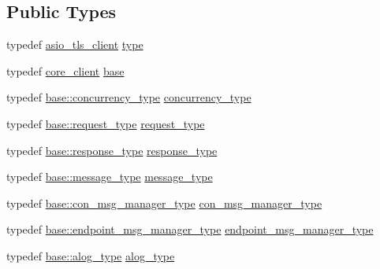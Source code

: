\subsection*{Public Types}
\begin{DoxyCompactItemize}
\item 
typedef \hyperlink{structwebsocketpp_1_1config_1_1asio__tls__client}{asio\+\_\+tls\+\_\+client} \hyperlink{structwebsocketpp_1_1config_1_1asio__tls__client_ac326e9357688f306119aacc22639259e}{type}
\item 
typedef \hyperlink{structwebsocketpp_1_1config_1_1core__client}{core\+\_\+client} \hyperlink{structwebsocketpp_1_1config_1_1asio__tls__client_ac352cb7bbd677155ad5329e7b419013f}{base}
\item 
typedef \hyperlink{structwebsocketpp_1_1config_1_1core__client_a4efeeb870e648c7405daab92d10fa5d6}{base\+::concurrency\+\_\+type} \hyperlink{structwebsocketpp_1_1config_1_1asio__tls__client_afd8b2322960ee1c93994d6a7a344fb4b}{concurrency\+\_\+type}
\item 
typedef \hyperlink{structwebsocketpp_1_1config_1_1core__client_a1fd74b16e3add246b1c356f6f14f206b}{base\+::request\+\_\+type} \hyperlink{structwebsocketpp_1_1config_1_1asio__tls__client_a43e2f23d37d5e3e5c6bc8d0b54f6c578}{request\+\_\+type}
\item 
typedef \hyperlink{structwebsocketpp_1_1config_1_1core__client_a5d8d6a90c7f36442a61a615da2ac8dcc}{base\+::response\+\_\+type} \hyperlink{structwebsocketpp_1_1config_1_1asio__tls__client_a8023cbcdddfd409027a88bbb1c5b6175}{response\+\_\+type}
\item 
typedef \hyperlink{structwebsocketpp_1_1config_1_1core__client_ae370adc4110d5d6c709167462467b11c}{base\+::message\+\_\+type} \hyperlink{structwebsocketpp_1_1config_1_1asio__tls__client_a3e879905aed676bdda6dce35f5d6956c}{message\+\_\+type}
\item 
typedef \hyperlink{structwebsocketpp_1_1config_1_1core__client_ae5d0b586e86a2520bdefe60d61849d37}{base\+::con\+\_\+msg\+\_\+manager\+\_\+type} \hyperlink{structwebsocketpp_1_1config_1_1asio__tls__client_aa7263bd0b6da524cf12652b236bcdf74}{con\+\_\+msg\+\_\+manager\+\_\+type}
\item 
typedef \hyperlink{structwebsocketpp_1_1config_1_1core__client_a1ccd94e4f4d1102cdb81b98284ed1166}{base\+::endpoint\+\_\+msg\+\_\+manager\+\_\+type} \hyperlink{structwebsocketpp_1_1config_1_1asio__tls__client_aeced2a30e2fe4f66d9c79c9e02dc6574}{endpoint\+\_\+msg\+\_\+manager\+\_\+type}
\item 
typedef \hyperlink{structwebsocketpp_1_1config_1_1core__client_a98c19fba0898e3842c001248df82fb2a}{base\+::alog\+\_\+type} \hyperlink{structwebsocketpp_1_1config_1_1asio__tls__client_ace0e6858f14ca5a442e3217c1afc8f6f}{alog\+\_\+type}

\end{DoxyCompactItemize}
